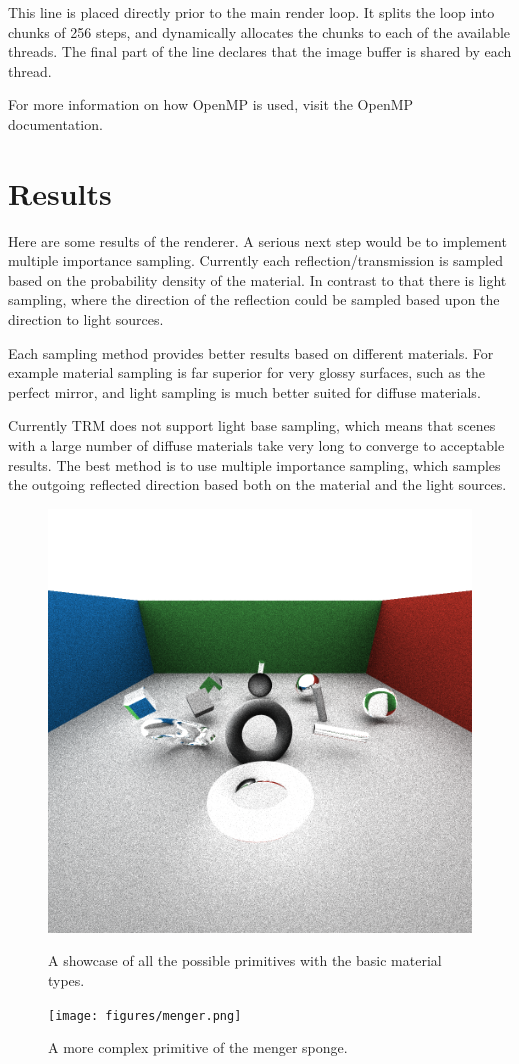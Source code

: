 \documentclass{amsart}
\begin{document}
This line is placed directly prior to the main render loop. It splits the loop
into chunks of 256 steps, and dynamically allocates the chunks to each of the
available threads. The final part of the line declares that the image buffer is
shared by each thread.

For more information on how OpenMP is used, visit the OpenMP documentation.

\section{Results}%
\label{sec:Results}

Here are some results of the renderer. A serious next step would be to
implement multiple importance sampling. Currently each reflection/transmission
is sampled based on the probability density of the material. In contrast to
that there is light sampling, where the direction of the reflection could be
sampled based upon the direction to light sources.

Each sampling method provides better results based on different materials. For
example material sampling is far superior for very glossy surfaces, such as the
perfect mirror, and light sampling is much better suited for diffuse materials.

Currently TRM does not support light base sampling, which means that scenes
with a large number of diffuse materials take very long to converge to
acceptable results. The best method is to use multiple importance sampling,
which samples the outgoing reflected direction based both on the material and
the light sources.

\begin{figure}[!htb]
    \includegraphics[width=\linewidth]{figures/objs.png}
    \caption{A showcase of all the possible primitives with the basic material
      types.}
  \endminipage\hfill
    \texttt{[image: figures/menger.png]}
    \caption{A more complex primitive of the menger sponge.}
  \endminipage\hfill
\end{figure}
\end{document}
